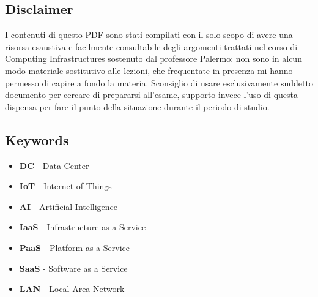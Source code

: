 \subsection{Disclaimer}
I contenuti di questo PDF sono stati compilati con il solo scopo di avere una 
risorsa esaustiva e facilmente consultabile degli argomenti trattati nel corso 
di Computing Infrastructures sostenuto dal professore Palermo: non sono in 
alcun modo materiale sostitutivo alle lezioni, che frequentate in presenza mi 
hanno permesso di capire a fondo la materia. Sconsiglio di usare esclusivamente 
suddetto documento per cercare di prepararsi all'esame, supporto invece l'uso 
di questa dispensa per fare il punto della situazione durante il periodo 
di studio.
\subsection{Keywords}
\begin{itemize}
    \item \textbf{DC} - Data Center
    \item \textbf{IoT} - Internet of Things
    \item \textbf{AI} - Artificial Intelligence
    \item \textbf{IaaS} - Infrastructure as a Service
    \item \textbf{PaaS} - Platform as a Service
    \item \textbf{SaaS} - Software as a Service
    \item \textbf{LAN} - Local Area Network
\end{itemize}
